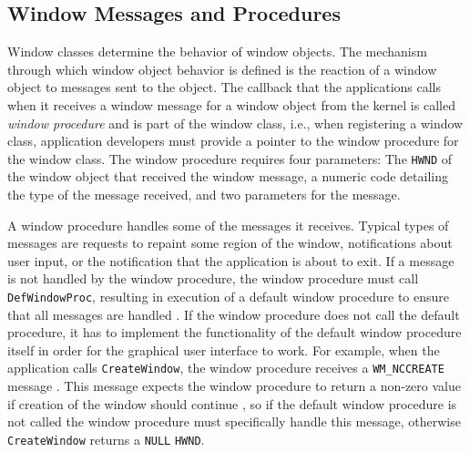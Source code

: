 		\subsection{Window Messages and Procedures}
			Window classes determine the behavior of window objects. The mechanism
			through which window object behavior is defined is the reaction of
			a window object to messages sent to the object. The callback that
			the applications calls when it receives a window message
			for a window object from the kernel is called
			\textit{window procedure} and is part of the window class, i.e., when
			registering a window class, application developers must provide a
			pointer to the window procedure for the window class. The window
			procedure requires four parameters: The \texttt{HWND} of the window
			object that received the window message, a numeric code detailing the
			type of the message received, and two parameters for the message.
			\cite{aboutwinproc}

			A window procedure handles some of the messages it receives.
			Typical types of messages are requests to repaint some region of
			the window, notifications about user input, or the notification
			that the application is about to exit. If a message is not handled
			by the window procedure, the window procedure must call
			\texttt{DefWindowProc}, resulting in execution of a default window
			procedure to ensure that all messages are handled
			\cite{aboutwinproc}. If the window procedure does not call the
			default procedure, it has to implement the functionality of the
			default window procedure itself in order for the graphical user
			interface to work. For example, when the application calls
			\texttt{CreateWindow},
			the window procedure receives a \texttt{WM\_NCCREATE}
			message \cite{createwindow}. This message expects the window procedure
			to return a non-zero value if creation of the window should continue
			\cite{wmnccreate},
			so if the default window procedure is not called the window procedure
			must specifically handle this message, otherwise \texttt{CreateWindow}
			returns a \texttt{NULL} \texttt{HWND}.

